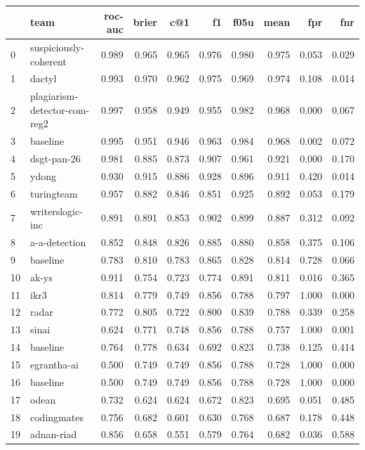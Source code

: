 \begin{tabular}{llrrrrrrrr}
\toprule
 & team & roc-auc & brier & c@1 & f1 & f05u & mean & fpr & fnr \\
\midrule
0 & suspiciously-coherent & 0.989 & 0.965 & 0.965 & 0.976 & 0.980 & 0.975 & 0.053 & 0.029 \\
1 & dactyl & 0.993 & 0.970 & 0.962 & 0.975 & 0.969 & 0.974 & 0.108 & 0.014 \\
2 & plagiarism-detector-com-reg2 & 0.997 & 0.958 & 0.949 & 0.955 & 0.982 & 0.968 & 0.000 & 0.067 \\
3 & baseline & 0.995 & 0.951 & 0.946 & 0.963 & 0.984 & 0.968 & 0.002 & 0.072 \\
4 & dsgt-pan-26 & 0.981 & 0.885 & 0.873 & 0.907 & 0.961 & 0.921 & 0.000 & 0.170 \\
5 & ydong & 0.930 & 0.915 & 0.886 & 0.928 & 0.896 & 0.911 & 0.420 & 0.014 \\
6 & turingteam & 0.957 & 0.882 & 0.846 & 0.851 & 0.925 & 0.892 & 0.053 & 0.179 \\
7 & writerslogic-inc & 0.891 & 0.891 & 0.853 & 0.902 & 0.899 & 0.887 & 0.312 & 0.092 \\
8 & a-a-detection & 0.852 & 0.848 & 0.826 & 0.885 & 0.880 & 0.858 & 0.375 & 0.106 \\
9 & baseline & 0.783 & 0.810 & 0.783 & 0.865 & 0.828 & 0.814 & 0.728 & 0.066 \\
10 & ak-ys & 0.911 & 0.754 & 0.723 & 0.774 & 0.891 & 0.811 & 0.016 & 0.365 \\
11 & ikr3 & 0.814 & 0.779 & 0.749 & 0.856 & 0.788 & 0.797 & 1.000 & 0.000 \\
12 & radar & 0.772 & 0.805 & 0.722 & 0.800 & 0.839 & 0.788 & 0.339 & 0.258 \\
13 & sinai & 0.624 & 0.771 & 0.748 & 0.856 & 0.788 & 0.757 & 1.000 & 0.001 \\
14 & baseline & 0.764 & 0.778 & 0.634 & 0.692 & 0.823 & 0.738 & 0.125 & 0.414 \\
15 & egrantha-ai & 0.500 & 0.749 & 0.749 & 0.856 & 0.788 & 0.728 & 1.000 & 0.000 \\
16 & baseline & 0.500 & 0.749 & 0.749 & 0.856 & 0.788 & 0.728 & 1.000 & 0.000 \\
17 & odean & 0.732 & 0.624 & 0.624 & 0.672 & 0.823 & 0.695 & 0.051 & 0.485 \\
18 & codingmates & 0.756 & 0.682 & 0.601 & 0.630 & 0.768 & 0.687 & 0.178 & 0.448 \\
19 & adnan-riad & 0.856 & 0.658 & 0.551 & 0.579 & 0.764 & 0.682 & 0.036 & 0.588 \\

\end{tabular}
